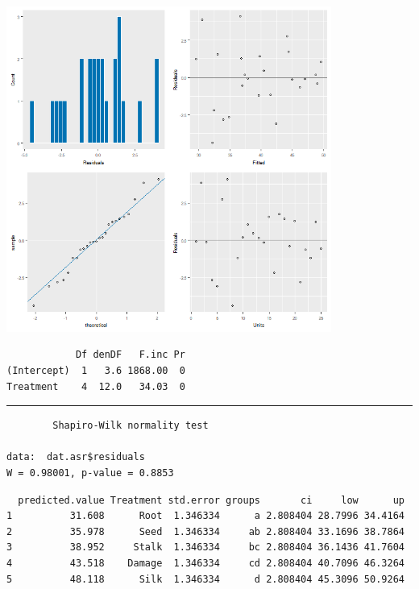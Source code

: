 \documentclass[a4paper, 10pt, fleqn, twosided]{memoir}
\begin{document}
\begin{tcolorbox}[title = Exercise 11 output]
\includegraphics[width=0.8\textwidth, frame]{Exercise11Resplot.png}
\end{tcolorbox}

\begin{tcolorbox}[title = Exercise 11 output continued]
\begin{verbatim}
            Df denDF   F.inc Pr
(Intercept)  1   3.6 1868.00  0
Treatment    4  12.0   34.03  0
\end{verbatim}
{\color{outpt} {\hrule height 1pt}}
\begin{verbatim}
        Shapiro-Wilk normality test

data:  dat.asr$residuals
W = 0.98001, p-value = 0.8853
\end{verbatim}
\end{tcolorbox}

\begin{tcolorbox}[title = Exercise 11 output continued]
\begin{verbatim}
  predicted.value Treatment std.error groups       ci     low      up
1          31.608      Root  1.346334      a 2.808404 28.7996 34.4164
2          35.978      Seed  1.346334     ab 2.808404 33.1696 38.7864
3          38.952     Stalk  1.346334     bc 2.808404 36.1436 41.7604
4          43.518    Damage  1.346334     cd 2.808404 40.7096 46.3264
5          48.118      Silk  1.346334      d 2.808404 45.3096 50.9264
\end{verbatim}
\end{tcolorbox}
\end{document}
